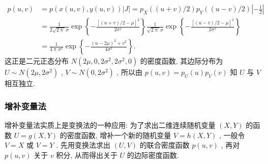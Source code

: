 \begin{example}
\begin{solution}
    		\begin{align*}
    			p(u,v)&=p(x(u,v),y(u,v))|J|=p_{X}((u+v)/2)p_{Y}((u-v)/2)\left|-\frac{1}{2}\right|\\
    			&=\frac{1}{2\sqrt{2\uppi}\sigma}\exp\left\{-\frac{[(u+v)/2-\mu]^2}{2\sigma^2}\right\}\frac{1}{\sqrt{2\uppi}\sigma}\exp\left\{-\frac{[(u-v)/2-\mu]^2}{2\sigma^2}\right\}\\
    			&=\frac{1}{4\uppi\sigma^2}\exp\left\{-\frac{(u-2\mu)^2+v^2}{4\sigma^2}\right\}.
    		\end{align*}
    		这正是二元正态分布 $N(2\mu,0,2\sigma^2,2\sigma^2,0)$ 的密度函数, 其边际分布为 $U\sim N(2\mu,2\sigma^2)$ , $V\sim N(0,2\sigma^2)$ , 所以由 $p(u,v)=p_{U}(u)p_{V}(v)$ 知 $U$ 与 $V$ 相互独立.
    	\end{solution}
    \end{example}
        \subsubsection{增补变量法}
        增补变量法实质上是变换法的一种应用: 为了求出二维连续随机变量 $(X,Y)$ 的函数 $U=g(X,Y)$ 的密度函数, 增补一个新的随机变量 $V=h(X,Y)$ , 一般令 $V=X$ 或 $V=Y$ . 先用变换法求出 $(U,V)$ 的联合密度函数 $p(u,v)$ , 再对 $p(u,v)$ 关于 $v$ 积分, 从而得出关于 $U$ 的边际密度函数.
        
